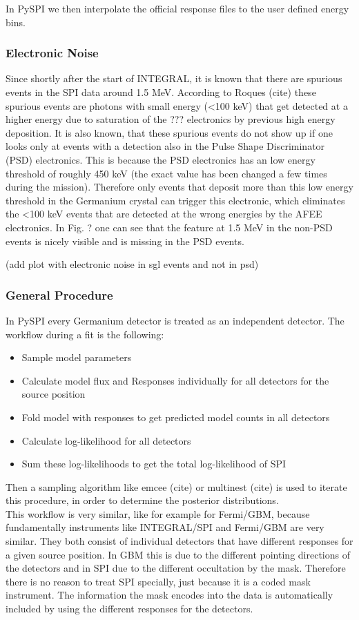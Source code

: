 \documentclass[modern]{aastex631}
\begin{document}
In PySPI we then interpolate the official response files to the user defined energy bins.

\subsubsection*{Electronic Noise}

Since shortly after the start of INTEGRAL, it is known that there are spurious events in the SPI data around 1.5 MeV. According to Roques (cite) these spurious events are photons with small energy (<100 keV) that get detected at a higher energy due to saturation of the ??? electronics by previous high energy deposition. It is also known, that these spurious events do not show up if one looks only at events with a detection also in the Pulse Shape Discriminator (PSD) electronics. This is because the PSD electronics has an low energy threshold of roughly 450 keV (the exact value has been changed a few times during the mission). Therefore only events that deposit more than this low energy threshold in the Germanium crystal can trigger this electronic, which eliminates the <100 keV events that are detected at the wrong energies by the AFEE electronics. In Fig. ? one can see that the feature at 1.5 MeV in the non-PSD events is nicely visible and is missing in the PSD events.


(add plot with electronic noise in sgl events and not in psd)

\subsubsection*{General Procedure}

In PySPI every Germanium detector is treated as an independent detector. The workflow during a fit is the following:
\begin{itemize}
  \item Sample model parameters
  \item Calculate model flux and Responses individually for all detectors for the source position
  \item Fold model with responses to get predicted model counts in all detectors
  \item Calculate log-likelihood for all detectors
  \item Sum these log-likelihoods to get the total log-likelihood of SPI
\end{itemize}
Then a sampling algorithm like emcee (cite) or multinest (cite) is used to iterate this procedure, in order to determine the posterior distributions.\\
This workflow is very similar, like for example for Fermi/GBM, because fundamentally instruments like INTEGRAL/SPI and Fermi/GBM are very similar. They both consist of individual detectors that have different responses for a given source position. In GBM this is due to the different pointing directions of the detectors and in SPI due to the different occultation by the mask. Therefore there is no reason to treat SPI specially, just because it is a coded mask instrument. The information the mask encodes into the data is automatically included by using the different responses for the detectors.
\end{document}
